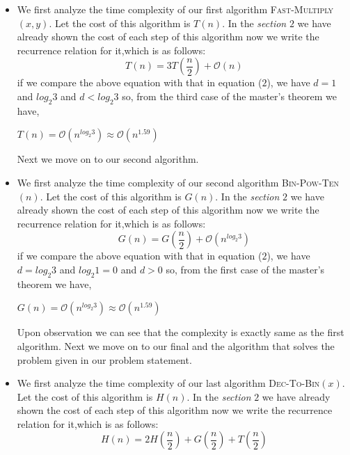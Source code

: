 \documentclass[12pt,a4paper]{article}%
\begin{document}
	\begin{itemize}
		\item{
			\begin{flushleft}
				We first analyze the time complexity of our first algorithm \textsc{Fast-Multiply}$(x,y)$. Let the cost of this algorithm is $T(n)$. In the \textit{section} $2$ we have already shown the cost of each step of this algorithm now we write the recurrence relation for it,which is as follows:\\
				\begin{equation}
					T(n) = 3T(\frac{n}{2}) + \mathcal{O}(n)
				\end{equation}
				if we compare the above equation with that in equation ($2$), we have $d=1$ and $log_2 {3}$ and $d<log_2 {3}$ so, from the third case of the master's theorem we have,\\
				\begin{center}
					$T(n)=\mathcal{O}(n^{log_2 {3}})\approx \mathcal{O}(n^{1.59})$
				\end{center}
				Next we move on to our second algorithm.
			\end{flushleft}
		}
	  \item{
	  	\begin{flushleft}
	  		We first analyze the time complexity of our second algorithm \textsc{Bin-Pow-Ten}$(n)$. Let the cost of this algorithm is $G(n)$. In the \textit{section} $2$ we have already shown the cost of each step of this algorithm now we write the recurrence relation for it,which is as follows:\\
	  		\begin{equation}
	  		G(n) = G(\frac{n}{2}) + \mathcal{O}(n^{log_2 {3}})
	  		\end{equation}
	  		if we compare the above equation with that in equation ($2$), we have $d=log_2 {3}$ and $log_2 {1}=0$ and $d>0$ so, from the first case of the master's theorem we have,\\
	  		\begin{center}
	  			$G(n)=\mathcal{O}(n^{log_2 {3}})\approx \mathcal{O}(n^{1.59})$
	  		\end{center}
	  		Upon observation we can see that the complexity is exactly same as the first algorithm. Next we move on to our final and the algorithm that solves the problem given in our problem statement.
	  		\end{flushleft}
	  	}
  	  \item{
  	  	\begin{flushleft}
  	  		We first analyze the time complexity of our last algorithm \textsc{Dec-To-Bin}$(x)$. Let the cost of this algorithm is $H(n)$. In the \textit{section} $2$ we have already shown the cost of each step of this algorithm now we write the recurrence relation for it,which is as follows:\\
  	  		\begin{equation}
  	  		H(n) = 2H(\frac{n}{2}) + G(\frac{n}{2}) + T(\frac{n}{2})
  	  		\end{equation}
  	  		

\end{flushleft}}
\end{itemize}
\end{document}
